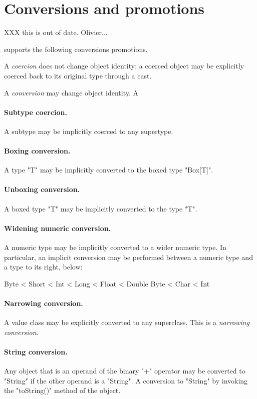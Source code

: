 \section{Conversions and promotions}\label{XtenConversions}\label{XtenPromotions}

XXX this is out of date.  Olivier...

\XtenCurrVer{} supports the following conversions
promotions.

A {\em coercion} does not change object identity;
a coerced object may be explicitly coerced back to its original
type through a cast.

A {\em conversion} may change object identity.  A

\paragraph{Subtype coercion.}
A subtype may be implicitly coerced to any supertype.

\paragraph{Boxing conversion.}
A type \xcd"T" may be implicitly converted to the
boxed type \xcd"Box[T]".

\paragraph{Unboxing conversion.}
A boxed type \xcd"T" may be implicitly converted to the
type \xcd"T".

\paragraph{Widening numeric conversion.}
A numeric type may be implicitly converted to a wider
numeric type.
In particular, an implicit conversion may be performed between
a numeric type and a type to its right, below:
\begin{xten}
Byte < Short < Int < Long < Float < Double
Byte < Char < Int
\end{xten}

\paragraph{Narrowing conversion.}
A value class may be explicitly converted to any superclass.
This is a {\em narrowing conversion}.

\paragraph{String conversion.}
Any object that is an operand of the binary
\xcd"+" operator may
be converted to \xcd"String" if the other operand is a \xcd"String".
A conversion to \xcd"String" by invoking the \xcd"toString()"
method of the object.


